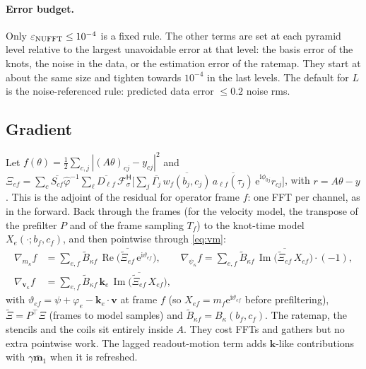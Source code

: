 \documentclass[11pt]{article}
\theoremstyle{remark}
\newcommand{\vv}{\bm v}
\newcommand{\ii}{\mathrm i}
\newcommand{\ee}{\mathrm e}
\newcommand{\herm}{\mathsf H}
\newcommand{\Fs}{\mathcal F_\sigma}
\newcommand{\Imag}{\operatorname{Im}}
\newcommand{\Real}{\operatorname{Re}}
\begin{document}
\paragraph{Error budget.} Only $\varepsilon_{\rm NUFFT}\le10^{-4}$ is a fixed rule. The other terms are set at each pyramid level relative to the largest unavoidable error at that level: the basis error of the knots, the noise in the data, or the estimation error of the ratemap. They start at about the same size and tighten towards $10^{-4}$ in the last levels. The default for $L$ is the noise-referenced rule: predicted data error $\le0.2$ noise rms.

\subsection{Gradient}
\label{sec:chaingrad}

Let $f(\theta)=\tfrac12\sum_{c,j}|(A\theta)_{cj}-y_{cj}|^2$ and $\Xi_{ef}=\sum_c\overline{S_{cf}}\hat\varphi^{-1}\sum_\ell\overline{D_{\ell f}}\,\Fs^\herm\bigl[\sum_j\overline{\Gamma_j}\,\overline{w_f(b_j,c_j)}\,\overline{a_{\ell f}(\tau_j)}\,\ee^{\ii\phi_{0j}}r_{cj}\bigr]$, with $r=A\theta-y$. This is the adjoint of the residual for operator frame $f$: one FFT per channel, as in the forward. Back through the frames (for the velocity model, the transpose of the prefilter $P$ and of the frame sampling $T_f$) to the knot-time model $X_e(\cdot;b_f,c_f)$, and then pointwise through \cref{eq:vm}:
\begin{equation}
\begin{aligned}
\nabla_{m_\kappa}f&=\sum_{e,f}\tilde B_{\kappa f}\,\Real\bigl(\overline{\tilde\Xi_{ef}}\,\ee^{\ii\vartheta_{ef}}\bigr),\qquad
\nabla_{\psi_\kappa}f=\sum_{e,f}\tilde B_{\kappa f}\,\Imag\bigl(\overline{\tilde\Xi_{ef}}\,X_{ef}\bigr)\cdot(-1),\\
\nabla_{\vv_\kappa}f&=\sum_{e,f}\tilde B_{\kappa f}\,\bm k_e\,\Imag\bigl(\overline{\tilde\Xi_{ef}}\,X_{ef}\bigr),
\end{aligned}
\label{eq:chaingrad}
\end{equation}
with $\vartheta_{ef}=\psi+\varphi_e-\bm k_e\cdot\vv$ at frame $f$ (so $X_{ef}=m_f\ee^{\ii\vartheta_{ef}}$ before prefiltering), $\tilde\Xi=P^\top\Xi$ (frames to model samples) and $\tilde B_{\kappa f}=B_\kappa(b_f,c_f)$. The ratemap, the stencils and the coils sit entirely inside $A$. They cost FFTs and gathers but no extra pointwise work. The lagged readout-motion term adds $\bm k$-like contributions with $\gamma\bar{\bm m}_1$ when it is refreshed.
\end{document}
